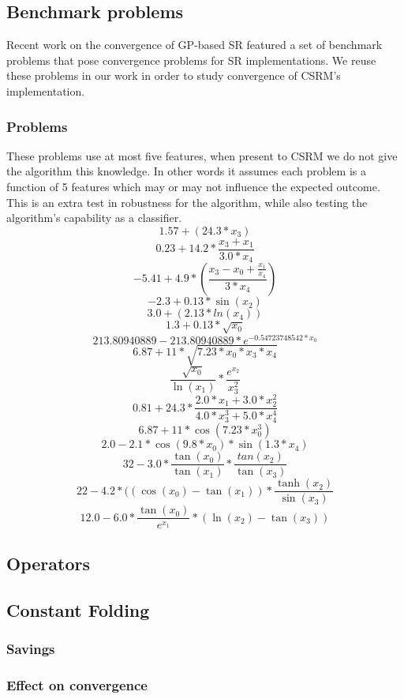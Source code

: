 \subsection{Benchmark problems}
Recent work on the convergence of GP-based SR \cite{SRAccur, SRBaseline} featured a set of benchmark problems that pose convergence problems for SR implementations. We reuse these problems in our work in order to study convergence of CSRM's implementation.
\subsubsection{Problems}
These problems use at most five features, when present to CSRM we do not give the algorithm this knowledge. In other words it assumes each problem is a function of 5 features which may or may not influence the expected outcome. This is an extra test in robustness for the algorithm, while also testing the algorithm's capability as a classifier.
\[
1.57 + (24.3*x_3)\]
\[0.23+14.2*\frac{x_3+x_1}{3.0*x_4}
\]
\[
-5.41 + 4.9* ( \frac{x_3-x_0 +  \frac{x_1}{x_4} } {3*x_4} )
\] 
\[-2.3 + 0.13*\sin(x_2)\]
\[3.0 + (2.13 * ln(x_4))\]
\[1.3 + 0.13* \sqrt{x_0}\]
\[213.80940889 - 213.80940889*e^{-0.54723748542*x_0}\]
\[6.87+11*\sqrt{7.23*x_0*x_3*x_4}\]
\[\frac{\sqrt{x_0}}{\ln(x_1)} *\frac{e^{x_2}}{x_3 ^ 2}\]
\[ 0.81 + 24.3 * \frac{ 2.0*x_1+3.0*x_2^2} {4.0*x_3^3 + 5.0*x_4^4}\]
\[6.87+ 11* \cos(7.23*x_0^3)\]
\[2.0 - 2.1 * \cos(9.8*x_0) * \sin(1.3*x_4)\]
\[32-3.0*  \frac{\tan(x_0)}{\tan(x_1)} *  \frac{tan(x_2)} {\tan(x_3)} \]
\[22 - 4.2*((\cos(x_0)-\tan(x_1))*\frac{\tanh(x_2)}{\sin(x_3)}\]
\[12.0 - 6.0* \frac{\tan(x_0)}{e^{x_1}} * (\ln(x_2)-\tan(x_3) ) \]
                    

\subsection{Operators}


\subsection{Constant Folding}
\subsubsection{Savings}
\subsubsection{Effect on convergence}

